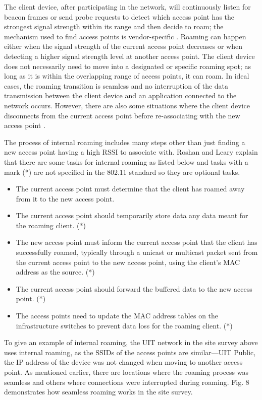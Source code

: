 \documentclass[conference]{IEEEtran}
\begin{document}
The client device, after participating in the network, will continuously listen for beacon frames or send probe requests to detect which access point has the strongest signal strength within its range and then decide to roam; the mechanism used to find access points is vendor-specific \cite{article_example}. Roaming can happen either when the signal strength of the current access point decreases or when detecting a higher signal strength level at another access point. The client device does not necessarily need to move into a designated or specific roaming spot; as long as it is within the overlapping range of access points, it can roam. In ideal cases, the roaming transition is seamless and no interruption of the data transmission between the client device and an application connected to the network occurs. However, there are also some situations where the client device disconnects from the current access point before re-associating with the new access point \cite{article_example} \cite{book_example}.

The process of internal roaming includes many steps other than just finding a new access point having a high RSSI to associate with. Roshan and Leary \cite{article_example} explain that there are some tasks for internal roaming as listed below and tasks with a mark (*) are not specified in the 802.11 standard so they are optional tasks.

\begin{itemize}
    \item The current access point must determine that the client has roamed away from it to the new access point.
    \item The current access point should temporarily store data any data meant for the roaming client. (*)
    \item The new access point must inform the current access point that the client has successfully roamed, typically through a unicast or multicast packet sent from the current access point to the new access point, using the client's MAC address as the source. (*)
    \item The current access point should forward the buffered data to the new access point. (*)
    \item The access points need to update the MAC address tables on the infrastructure switches to prevent data loss for the roaming client. (*)
\end{itemize}


To give an example of internal roaming, the UIT network in the site survey above uses internal roaming, as the SSIDs of the access points are similar—UIT Public, the IP address of the device was not changed when moving to another access point. As mentioned earlier, there are locations where the roaming process was seamless and others where connections were interrupted during roaming. Fig. 8 demonstrates how seamless roaming works in the site survey.
\end{document}
